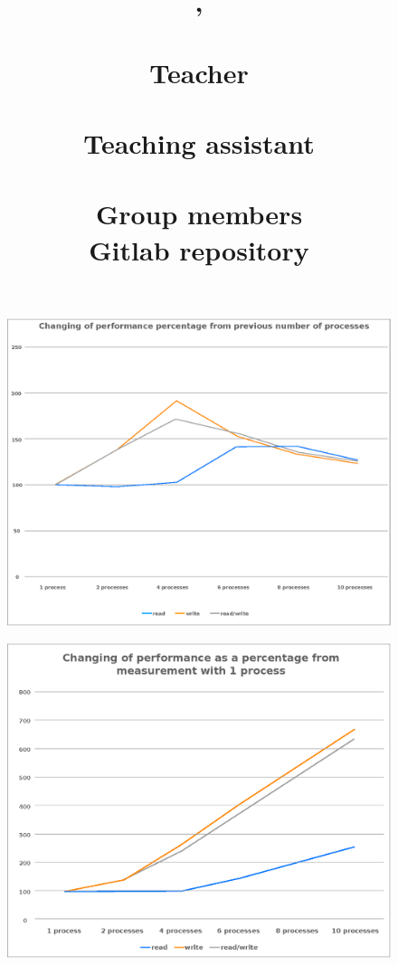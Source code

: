 \documentclass[final,a4paper]{article}
\title{
  \vspace{4em}
  \pagenumbering{gobble}
  \begin{center}
  {\LARGE \bf \course{}, \semester}\\
  {\Large \bf \assignment}\\
  \vspace{6em}
  {\normalsize
  {\bf Teacher}\\
  {\lecturer}\vspace{1em}\\
  {\bf Teaching assistant}\\
  {\assistants}\vspace{1em}\\
  {\bf Group members}\\
  \authors
  {\bf Gitlab repository}\vspace{-1em}\\
  {\codebase}}
  \end{center}
}
\author{}
\date{}
\begin{document}
\maketitle
\pagebreak
{}

\begin{figure}
  \centering
  \includegraphics[scale=.7]{percentages.eps}
\end{figure}

\begin{figure}
  \centering
  \includegraphics[scale=.6]{percentages1.eps}
\end{figure}
\end{document}

